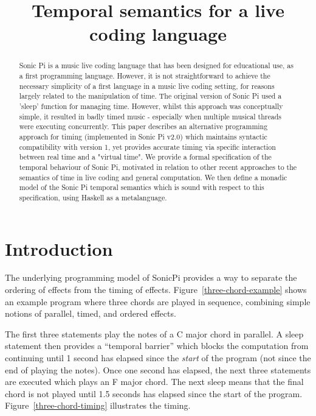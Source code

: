 \documentclass[preprint]{sigplanconf}
\title{Temporal semantics for a live coding language}
\newcommand{\note}[1]{{\color{blue}{#1}}}
\theoremstyle{definition}
\newcommand{\sleepOp}{\textsf{sleep}}
\begin{document}
\maketitle

\begin{abstract}
Sonic Pi is a music live coding language that has been designed for
educational use, as a first programming language. However, it is
not straightforward to achieve the necessary simplicity of a first language
in a music live coding setting, for reasons largely related to the
manipulation of time. The original version of Sonic Pi used a 'sleep'
function for managing time. However, whilst this approach was conceptually
simple, it resulted in badly timed music - especially when multiple musical
threads were executing concurrently. This paper describes an alternative
programming approach for timing (implemented in Sonic Pi v2.0) which
maintains syntactic compatibility with version 1, yet provides accurate
timing via specific interaction between real time and a "virtual time".
We provide a formal specification of the temporal behaviour of Sonic Pi,
motivated in relation to other recent approaches to the semantics of time in
live coding and general computation. We then define a monadic model of the
Sonic Pi temporal semantics which is sound with respect to this
specification, using Haskell as a metalanguage. 
\end{abstract}

\section{Introduction}
\label{sec:introduction}

\note{Introduction to SonicPi}

The underlying programming model of SonicPi provides a way to separate
the ordering of effects from the timing of
effects. Figure~\ref{three-chord-example} shows an example program
where three chords are played in sequence, combining simple notions of 
parallel, timed, and ordered effects.

The first three statements play the notes of a C major chord in
parallel.  A \sleepOp{} statement then provides a ``temporal barrier''
which blocks the computation from continuing until 1 second has
elapsed since the \emph{start} of the program (not since the end of
playing the notes). Once one second has elapsed, the next three
statements are executed which plays an F major chord. The next
\sleepOp{} means that the final chord is not played until 1.5 seconds
has elapsed since the start of the
program. Figure~\ref{three-chord-timing} illustrates the timing.
\end{document}
